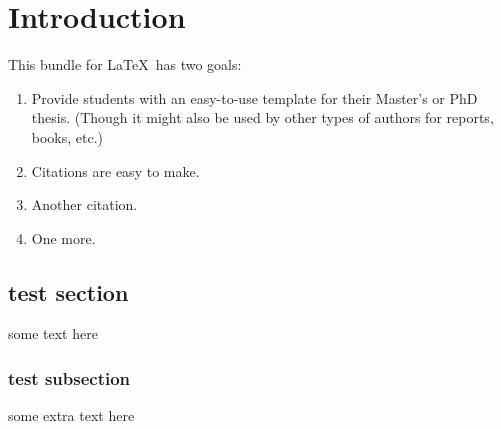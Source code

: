 \chapter{Introduction}\label{ch:introduction}
This bundle for \LaTeX\ has two goals:
\begin{enumerate}
    \item Provide students with an easy-to-use template for their
    Master's
    or PhD thesis. (Though it might also be used by other types of
    authors
    for reports, books, etc.)
    \item Citations are easy to make. \citep[][p. 123]{bringhurst:2002}
    \item Another citation. \citep[][p. 12]{knuth:1976}
    \item One more. \citep{sommerville:1992}
\end{enumerate}

\section*{test section}
some text here
\subsection*{test subsection}
some extra text here
